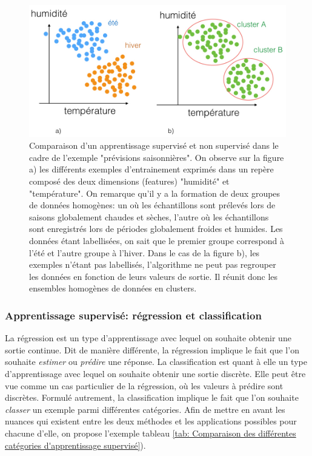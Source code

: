 \begin{figure}[H]
	\centering\includegraphics[width=13cm]{images/apprentissage_meteo.jpeg}
	\caption[Comparaison d'un apprentissage supervisé et non supervisé dans le cadre de l'exemple "prévisions saisonnières"]{Comparaison d'un apprentissage supervisé et non supervisé dans le cadre de l'exemple "prévisions saisonnières". On observe sur la figure a) les différents exemples d'entrainement exprimés dans un repère composé des deux dimensions (features) "humidité" et "température". On remarque qu'il y a la formation de deux groupes de données homogènes: un où les échantillons sont prélevés lors de saisons globalement chaudes et sèches, l'autre où les échantillons sont enregistrés lors de périodes globalement froides et humides. Les données étant labellisées, on sait que le premier groupe correspond à l'été et l'autre groupe à l'hiver. Dans le cas de la figure b), les exemples n'étant pas labellisés, l'algorithme ne peut pas regrouper les données en fonction de leurs valeurs de sortie. Il réunit donc les ensembles homogènes de données en clusters.}
	\label{fig:Comparaison d'un apprentissage supervisé et non supervisé dans le cadre de l'exemple prévision saisonnières}
\end{figure}


\subsubsection{Apprentissage supervisé: régression et classification} 
\label{Le Machine Learning: Généralités sur le Machine Learning: Le modèle:Regression et classification}
 La régression est un type d'apprentissage avec lequel on souhaite obtenir une sortie continue. Dit de manière différente, la régression implique le fait que l'on souhaite \emph{estimer} ou \emph{prédire} une réponse. La classification est quant à elle un type d'apprentissage avec lequel on souhaite obtenir une sortie discrète. Elle peut être vue comme un cas particulier de la régression, où les valeurs à prédire sont discrètes. Formulé autrement, la classification implique le fait que l'on souhaite \emph{classer} un exemple parmi différentes catégories. 
 \newline
 Afin de mettre en avant les nuances qui existent entre les deux méthodes et les applications possibles pour chacune d'elle, on propose l'exemple tableau \ref {tab: Comparaison des différentes catégories d'apprentissage supervisé}).

